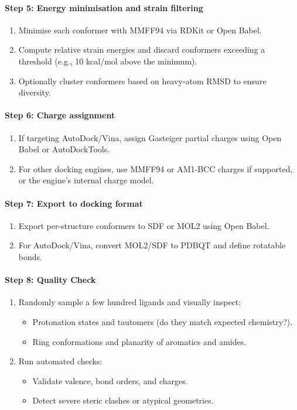 \documentclass[12pt]{article}
\begin{document}
\paragraph{Step 5: Energy minimisation and strain filtering}

\begin{enumerate}
  \item Minimise each conformer with MMFF94 via RDKit or Open Babel.
  \item Compute relative strain energies and discard conformers exceeding a threshold (e.g., 10 kcal/mol above the minimum).
  \item Optionally cluster conformers based on heavy-atom RMSD to ensure diversity.
\end{enumerate}

\paragraph{Step 6: Charge assignment}

\begin{enumerate}
  \item If targeting AutoDock/Vina, assign Gasteiger partial charges using Open Babel or AutoDockTools.
  \item For other docking engines, use MMFF94 or AM1-BCC charges if supported, or the engine's internal charge model.
\end{enumerate}

\paragraph{Step 7: Export to docking format}

\begin{enumerate}
  \item Export per-structure conformers to SDF or MOL2 using Open Babel.
  \item For AutoDock/Vina, convert MOL2/SDF to PDBQT and define rotatable bonds.
\end{enumerate}

\paragraph{Step 8: Quality Check}

\begin{enumerate}
  \item Randomly sample a few hundred ligands and visually inspect:
  \begin{itemize}
    \item Protonation states and tautomers (do they match expected chemistry?).
    \item Ring conformations and planarity of aromatics and amides.
  \end{itemize}
  \item Run automated checks:
  \begin{itemize}
    \item Validate valence, bond orders, and charges.
    \item Detect severe steric clashes or atypical geometries.
  \end{itemize}
\end{enumerate}
\end{document}
